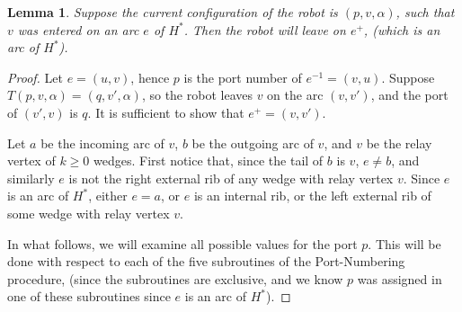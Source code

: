 \documentclass[12pt,letterpaper,oneside]{book}
\newtheorem{lemma}[theorem]{Lemma}
\begin{document}
\begin{lemma}\label{lemmainvariant}
Suppose the current configuration of the robot is $(p,v,\alpha)$, such that $v$ was entered on 
an arc $e$ of $H^*$.  Then the robot will leave on $e^+$, (which is an arc of $H^*$).  
\end{lemma}
\begin{proof}

Let $e=(u,v)$, hence $p$ is the port number of $e^{-1}=(v,u)$.  
Suppose $T(p,v,\alpha)=(q,v',\alpha)$, so the robot leaves $v$ on the arc $(v,v')$, and the port of $(v',v)$ is $q$.  
It is sufficient to show that $e^+=(v,v')$.  




Let $a$ be the incoming arc of $v$, $b$ be the outgoing arc of $v$, and $v$ 
be the relay vertex of $k\ge 0$ wedges.  First notice that, since the tail of $b$ is $v$, 
$e\ne b$, and similarly $e$ is not the right external rib of any wedge 
with relay vertex $v$.  Since $e$ is an arc of $H^*$, either $e=a$, or $e$ is an internal rib, or the left external rib of some wedge with 
relay vertex $v$.%


In what follows, we will examine all possible values for the port $p$.  This will 
be done with respect to each of the five subroutines of the Port-Numbering procedure, (since the 
subroutines are exclusive, and we know $p$ was assigned in one of these subroutines since $e$ is an arc of $H^*$).  


\end{proof}
\end{document}

